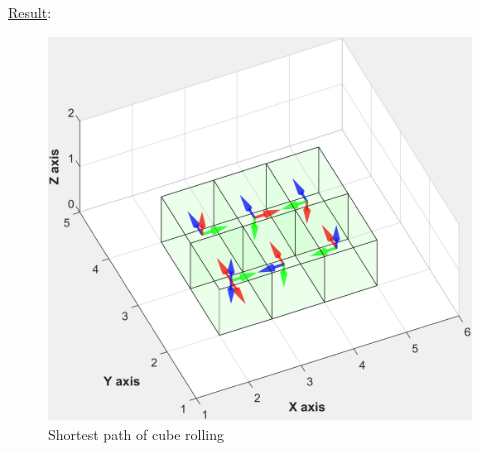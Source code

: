 \noindent\uline{Result}: 
\begin{figure}[h]
\centering
	\includegraphics[width=1\textwidth]{image/cubePath1.pdf}
	\caption{Shortest path of cube rolling}
	\label{fig:cubePath1}
\end{figure}


